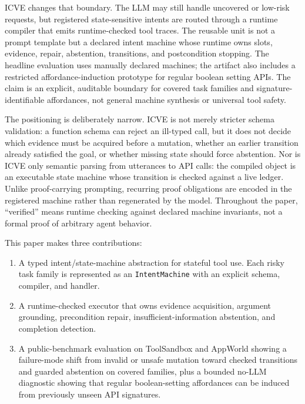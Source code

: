 \documentclass[11pt]{article}
\begin{document}
ICVE changes that boundary. The LLM may still handle uncovered or low-risk requests, but
registered state-sensitive intents are routed through a runtime compiler that emits
runtime-checked tool traces. The reusable unit is not a prompt template but a declared
intent machine whose runtime owns slots, evidence, repair, abstention, transitions, and
postcondition stopping. The headline evaluation uses manually declared machines; the
artifact also includes a restricted affordance-induction prototype for regular boolean
setting APIs. The claim is an explicit, auditable boundary for covered task families and
signature-identifiable affordances, not general machine synthesis or universal tool
safety.

The positioning is deliberately narrow. ICVE is not merely stricter schema validation: a
function schema can reject an ill-typed call, but it does not decide which evidence must
be acquired before a mutation, whether an earlier transition already satisfied the goal,
or whether missing state should force abstention. Nor is ICVE only semantic parsing from
utterances to API calls: the compiled object is an executable state machine whose
transition is checked against a live ledger. Unlike proof-carrying prompting, recurring
proof obligations are encoded in the registered machine rather than regenerated by the
model. Throughout the paper, ``verified'' means runtime checking against declared machine
invariants, not a formal proof of arbitrary agent behavior.

This paper makes three contributions:
\begin{enumerate}[leftmargin=*]
\item A typed intent/state-machine abstraction for stateful tool use. Each risky task
family is represented as an \texttt{IntentMachine} with an explicit schema, compiler, and
handler.
\item A runtime-checked executor that owns evidence acquisition, argument grounding,
precondition repair, insufficient-information abstention, and completion detection.
\item A public-benchmark evaluation on ToolSandbox and AppWorld showing a failure-mode
shift from invalid or unsafe mutation toward checked transitions and guarded abstention on
covered families, plus a bounded no-LLM diagnostic showing that regular boolean-setting
affordances can be induced from previously unseen API signatures.
\end{enumerate}
\end{document}
